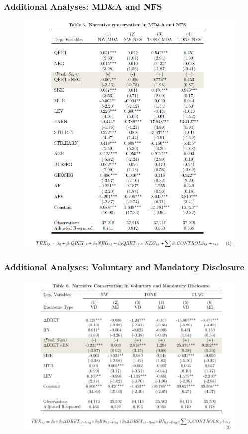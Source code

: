 \documentclass{beamer}
\begin{document}
\begin{frame}
\frametitle{Additional Analyses: MD\&A and NFS}
	\begin{figure}[h]
	\centering
	\includegraphics[width=0.9\linewidth]{tab5}
	\label{tab5}
	\end{figure}
\end{frame}
\begin{frame}
\frametitle{Additional Analyses: Voluntary and Mandatory Disclosure}
	\begin{figure}[h]
	\centering
	\includegraphics[width=0.9\linewidth]{tab6}
	\label{tab6}
	\end{figure}
	
\end{frame}
\end{document}
